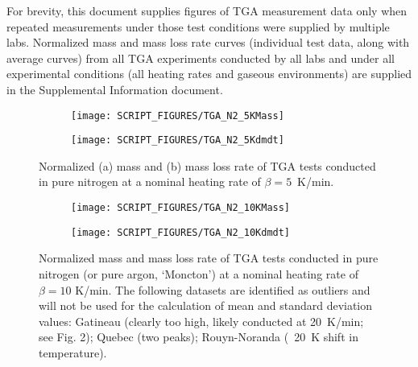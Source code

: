 \documentclass{book}
\begin{document}
For brevity, this document supplies figures of TGA measurement data only when repeated measurements under those test conditions were supplied by multiple labs. Normalized mass and mass loss rate curves (individual test data, along with average curves) from all TGA experiments conducted by all labs and under all experimental conditions (all heating rates and gaseous environments) are supplied in the Supplemental Information document.

\begin{figure}
\centering
\begin{subfigure}[b]{0.85\textwidth}
   \texttt{[image: SCRIPT\_FIGURES/TGA\_N2\_5KMass]}
   \caption{}
   \label{Fig:TGA_N2_5KMass}
\end{subfigure}

\begin{subfigure}[b]{0.85\textwidth}
   \texttt{[image: SCRIPT\_FIGURES/TGA\_N2\_5Kdmdt]}
   \caption{}
   \label{Fig:TGA_N2_5Kdmdt}
\end{subfigure}

  \caption{Normalized (a) mass and (b) mass loss rate of TGA tests conducted in pure nitrogen at a nominal heating rate of $\beta=5$~K/min.}
  \label{Fig:TGA_N2_5K}
\end{figure}

\begin{figure}
\centering
\begin{subfigure}[b]{0.85\textwidth}
   \texttt{[image: SCRIPT\_FIGURES/TGA\_N2\_10KMass]}
   \caption{}
   \label{Fig:TGA_N2_10KMass}
\end{subfigure}

\begin{subfigure}[b]{0.85\textwidth}
   \texttt{[image: SCRIPT\_FIGURES/TGA\_N2\_10Kdmdt]}
   \caption{}
   \label{Fig:TGA_N2_10Kdmdt}
\end{subfigure}

  \caption{Normalized mass and mass loss rate of TGA tests conducted in pure nitrogen (or pure argon, ‘Moncton’) at a nominal heating rate of $\beta = 10$ K/min. The following datasets are identified as outliers and will not be used for the calculation of mean and standard deviation values: Gatineau (clearly too high, likely conducted at 20~K/min; see Fig. 2); Quebec (two peaks); Rouyn-Noranda (~20~K shift in temperature).}
  \label{Fig:TGA_N2_10K}
\end{figure}
\end{document}
